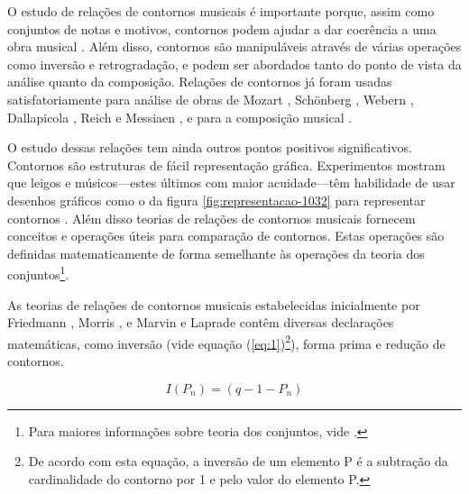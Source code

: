\documentclass[12pt]{article}
\begin{document}
O estudo de relações de contornos musicais é importante porque, assim
como conjuntos de notas e motivos, contornos podem ajudar a dar
coerência a uma obra musical \cite{clifford95:contour}. Além disso,
contornos são manipuláveis através de várias operações como inversão e
retrogradação, e podem ser abordados tanto do ponto de vista da
análise quanto da composição. Relações de contornos já foram usadas
satisfatoriamente para análise de obras de Mozart
\cite{beard03:contour}, Schönberg \cite{friedmann85:methodology},
Webern \cite{clifford95:contour,sampaio08:analise}, Dallapicola
\cite{marvin88:generalized}, Reich \cite{quinn97:fuzzy} e Messiaen
\cite{schultz08:melodic}, e para a composição musical
\cite{sampaio08:em}.

O estudo dessas relações tem ainda outros pontos positivos
significativos. Contornos são estruturas de fácil representação
gráfica. Experimentos mostram que leigos e músicos---estes últimos com
maior acuidade---têm habilidade de usar desenhos gráficos como o da
figura \ref{fig:representacao-1032} para representar contornos
\cite[p. 69]{marvin88:generalized}. Além disso teorias de relações de
contornos musicais fornecem conceitos e operações úteis para
comparação de contornos. Estas operações são definidas matematicamente
de forma semelhante às operações da teoria dos conjuntos\footnote{Para
  maiores informações sobre teoria dos conjuntos, vide
  \cite{straus90:introduction}.}.

As teorias de relações de contornos musicais estabelecidas
inicialmente por Friedmann \cite{friedmann85:methodology}, Morris
\cite{morris87:composition,morris93:directions}, e Marvin e Laprade
\cite{marvin.ea87:relating,marvin88:generalized} contêm diversas
declarações matemáticas, como inversão (vide equação
(\ref{eq:1})\footnote{De acordo com esta equação, a inversão de um
  elemento P é a subtração da cardinalidade do contorno por 1 e pelo
  valor do elemento P.}), forma prima e redução de contornos.

\begin{equation}
  \label{eq:1}
  I(P_n) = (q − 1 − P_n)
\end{equation}
\end{document}
